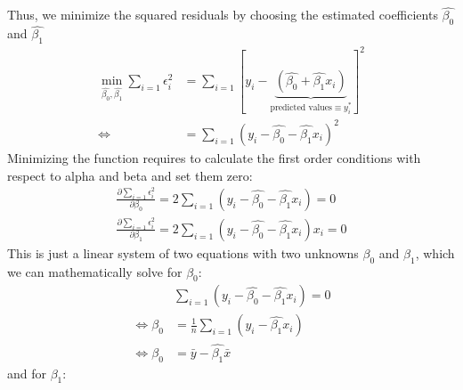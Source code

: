 \documentclass[
  12pt,
  oneside]{book}
\theoremstyle{definition}
\theoremstyle{definition}
\theoremstyle{definition}
\theoremstyle{definition}
\theoremstyle{remark}
\begin{document}
Thus, we minimize the squared residuals by choosing the estimated coefficients \(\hat{\beta_{0}}\) and \(\hat{\beta_{1}}\)
\begin{align*}
\min_{\hat{\beta_{0}}, \hat{\beta_{1}}}\sum_{i=1} \epsilon_i^2 &= \sum_{i=1}    \left[y_i - \underbrace{(\hat{\beta_{0}} + \hat{\beta_{1}} x_i)}_{\text{predicted values}\equiv y_i^*}\right]^2\\
\Leftrightarrow  &=  \sum_{i=1} (y_i - \hat{\beta_{0}} - \hat{\beta_{1}} x_i)^2
\end{align*}
Minimizing the function requires to calculate the first order conditions with respect to alpha and beta and set them zero:
\begin{align*}
\frac{\partial \sum_{i=1} \epsilon_i^2}{\partial \beta_{0}}=2 \sum_{i=1}    (y_i - \hat{\beta_{0}} - \hat{\beta_{1}} x_i)=0\\
\frac{\partial \sum_{i=1} \epsilon_i^2}{\partial \beta_{1}}=2 \sum_{i=1}    (y_i - \hat{\beta_{0}} - \hat{\beta_{1}} x_i)x_i=0
\end{align*}
This is just a linear system of two equations with two unknowns \(\beta_{0}\) and \(\beta_{1}\), which we can mathematically solve for \(\beta_0\):
\begin{align*}
    &\sum_{i=1} (y_i - \hat{\beta_{0}} - \hat{\beta_{1}} x_i)=0\\
    \Leftrightarrow \hat{\beta_{0}}&=\frac{1}{n}\sum_{i=1}  (y_i  - \hat{\beta_{1}} x_i)\\
    \Leftrightarrow \hat{\beta_{0}}&=\bar{y}-\hat{\beta_{1}}\bar{x}
\end{align*}
and for \(\beta_{1}\):
\end{document}
